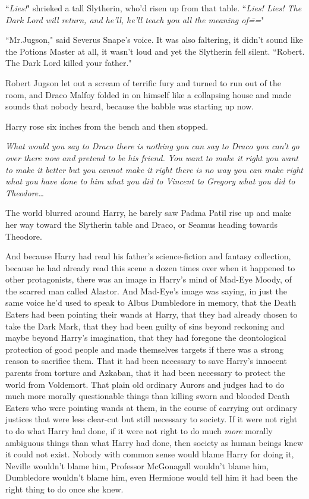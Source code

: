 ``\emph{Lies!}" shrieked a tall Slytherin, who'd risen up from that table. ``\emph{Lies! Lies! The Dark Lord will return, and he'll, he'll teach you all the meaning of\===}"

``Mr.\?Jugson," said Severus Snape's voice. It was also faltering, it didn't sound like the Potions Master at all, it wasn't loud and yet the Slytherin fell silent. ``Robert. The Dark Lord killed your father."

Robert Jugson let out a scream of terrific fury and turned to run out of the room, and Draco Malfoy folded in on himself like a collapsing house and made sounds that nobody heard, because the babble was starting up now.

Harry rose six inches from the bench and then stopped.

\emph{What would you say to Draco there is nothing you can say to Draco you can't go over there now and pretend to be his friend. You want to make it right you want to make it better but you cannot make it right there is no way you can make right what you have done to him what you did to Vincent to Gregory what you did to Theodore{\ldots}}

The world blurred around Harry, he barely saw Padma Patil rise up and make her way toward the Slytherin table and Draco, or Seamus heading towards Theodore.

And because Harry had read his father's science-fiction and fantasy collection, because he had already read this scene a dozen times over when it happened to other protagonists, there was an image in Harry's mind of Mad-Eye Moody, of the scarred man called Alastor. And Mad-Eye's image was saying, in just the same voice he'd used to speak to Albus Dumbledore in memory, that the Death Eaters had been pointing their wands at Harry, that they had already chosen to take the Dark Mark, that they had been guilty of sins beyond reckoning and maybe beyond Harry's imagination, that they had foregone the deontological protection of good people and made themselves targets if there was a strong reason to sacrifice them. That it had been necessary to save Harry's innocent parents from torture and Azkaban, that it had been necessary to protect the world from Voldemort. That plain old ordinary Aurors and judges had to do much more morally questionable things than killing sworn and blooded Death Eaters who were pointing wands at them, in the course of carrying out ordinary justices that were less clear-cut but still necessary to society. If it were not right to do what Harry had done, if it were not right to do much \emph{more} morally ambiguous things than what Harry had done, then society as human beings knew it could not exist. Nobody with common sense would blame Harry for doing it, Neville wouldn't blame him, Professor McGonagall wouldn't blame him, Dumbledore wouldn't blame him, even Hermione would tell him it had been the right thing to do once she knew.

